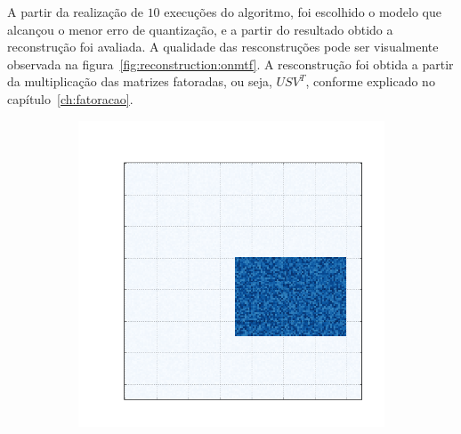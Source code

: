 \documentclass[
    12pt,                %
    oneside,            %
    a4paper,            %
    english,            %
    brazil                %
    ]{abntex2ppgsi}
\begin{document}
A partir da realização de $10$ execuções do algoritmo, foi escolhido o modelo que alcançou o menor erro de quantização, e a partir do resultado obtido a reconstrução foi avaliada.
A qualidade das resconstruções pode ser visualmente observada na figura~\ref{fig:reconstruction:onmtf}.
A resconstrução foi obtida a partir da multiplicação das matrizes fatoradas, ou seja, $USV^T$, conforme explicado no capítulo~\ref{ch:fatoracao}.

\begin{figure}[H]
\centering
    \caption{
        As primeiras cinco matrizes são as matrizes originais, as demais são suas respectivas reconstruções, realizadas a partir dos resultados obtidos com o algoritmo \textit{ONMTF}.
    }
    \begin{subfigure}[b]{0.18\textwidth}
        \includegraphics[width=\textwidth]{img/a-bic-structure.png}
    \end{subfigure}
    \begin{subfigure}[b]{0.18\textwidth}

\end{subfigure}
\end{figure}
\end{document}
